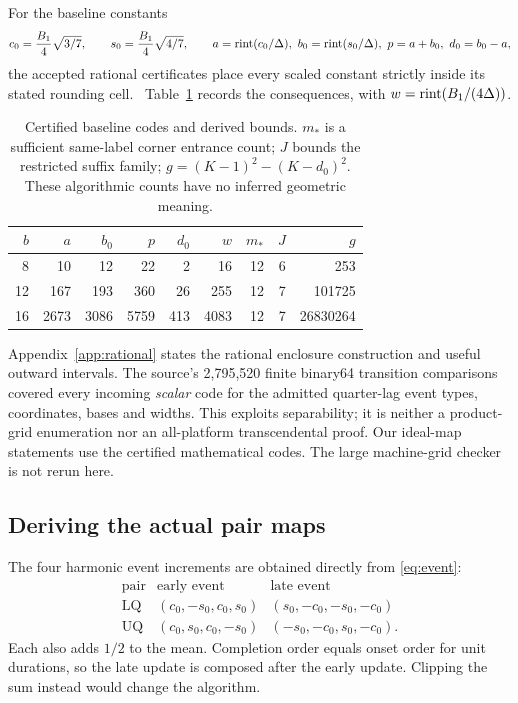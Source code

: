 For the baseline constants
\begin{equation}\label{eq:cs}
 c_0=\frac{B_1}{4}\sqrt{3/7},\qquad
 s_0=\frac{B_1}{4}\sqrt{4/7},\qquad
 a=\operatorname{rint}(c_0/\Delta),\ b_0=\operatorname{rint}(s_0/\Delta),\
 p=a+b_0,\ d_0=b_0-a,
\end{equation}
the accepted rational certificates place every scaled constant strictly inside its stated rounding cell.~\cite{Mechanism} Table~\ref{tab:codes} records the consequences, with $w=\operatorname{rint}(B_1/(4\Delta))$.
\begin{table}[ht]\centering
\begin{tabular}{rrrrrrrrr}\toprule
$b$&$a$&$b_0$&$p$&$d_0$&$w$&$m_*$&$J$&$g$\\\midrule
8&10&12&22&2&16&12&6&253\\
12&167&193&360&26&255&12&7&101725\\
16&2673&3086&5759&413&4083&12&7&26830264\\\bottomrule
\end{tabular}
\caption{Certified baseline codes and derived bounds. $m_*$ is a sufficient same-label corner entrance count; $J$ bounds the restricted suffix family; $g=(K-1)^2-(K-d_0)^2$. These algorithmic counts have no inferred geometric meaning.}
\label{tab:codes}
\end{table}
Appendix~\ref{app:rational} states the rational enclosure construction and useful outward intervals. The source's 2,795,520 finite binary64 transition comparisons covered every incoming \emph{scalar} code for the admitted quarter-lag event types, coordinates, bases and widths. This exploits separability; it is neither a product-grid enumeration nor an all-platform transcendental proof. Our ideal-map statements use the certified mathematical codes. The large machine-grid checker is not rerun here.

\subsection{Deriving the actual pair maps}
The four harmonic event increments are obtained directly from \eqref{eq:event}:
\begin{equation}\label{eq:events}
\begin{array}{c|c|c}
\text{pair}&\text{early event}&\text{late event}\\\hline
\mathrm{LQ}&(c_0,-s_0,c_0,s_0)&(s_0,-c_0,-s_0,-c_0)\\
\mathrm{UQ}&(c_0,s_0,c_0,-s_0)&(-s_0,-c_0,s_0,-c_0).
\end{array}
\end{equation}
Each also adds $1/2$ to the mean. Completion order equals onset order for unit durations, so the late update is composed after the early update. Clipping the sum instead would change the algorithm.

